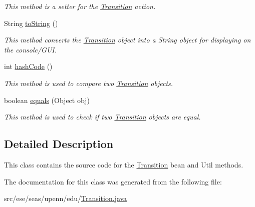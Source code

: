 \begin{DoxyCompactItemize}
\begin{DoxyCompactList}\small\item\em This method is a setter for the \hyperlink{classese_1_1seas_1_1upenn_1_1edu_1_1_transition}{Transition} action. \end{DoxyCompactList}\item 
\hypertarget{classese_1_1seas_1_1upenn_1_1edu_1_1_transition_ae9e57256dc34d80b35316193f3d4807a}{}String \hyperlink{classese_1_1seas_1_1upenn_1_1edu_1_1_transition_ae9e57256dc34d80b35316193f3d4807a}{to\+String} ()\label{classese_1_1seas_1_1upenn_1_1edu_1_1_transition_ae9e57256dc34d80b35316193f3d4807a}

\begin{DoxyCompactList}\small\item\em This method converts the \hyperlink{classese_1_1seas_1_1upenn_1_1edu_1_1_transition}{Transition} object into a String object for displaying on the console/\+G\+U\+I. \end{DoxyCompactList}\item 
\hypertarget{classese_1_1seas_1_1upenn_1_1edu_1_1_transition_a6ef52b94cb2f06593fff3144d9db61fb}{}int \hyperlink{classese_1_1seas_1_1upenn_1_1edu_1_1_transition_a6ef52b94cb2f06593fff3144d9db61fb}{hash\+Code} ()\label{classese_1_1seas_1_1upenn_1_1edu_1_1_transition_a6ef52b94cb2f06593fff3144d9db61fb}

\begin{DoxyCompactList}\small\item\em This method is used to compare two \hyperlink{classese_1_1seas_1_1upenn_1_1edu_1_1_transition}{Transition} objects. \end{DoxyCompactList}\item 
\hypertarget{classese_1_1seas_1_1upenn_1_1edu_1_1_transition_a704a4dd99037e7a33b79d1d785210d67}{}boolean \hyperlink{classese_1_1seas_1_1upenn_1_1edu_1_1_transition_a704a4dd99037e7a33b79d1d785210d67}{equals} (Object obj)\label{classese_1_1seas_1_1upenn_1_1edu_1_1_transition_a704a4dd99037e7a33b79d1d785210d67}

\begin{DoxyCompactList}\small\item\em This method is used to check if two \hyperlink{classese_1_1seas_1_1upenn_1_1edu_1_1_transition}{Transition} objects are equal. \end{DoxyCompactList}\end{DoxyCompactItemize}


\subsection{Detailed Description}
This class contains the source code for the \hyperlink{classese_1_1seas_1_1upenn_1_1edu_1_1_transition}{Transition} bean and Util methods. 

The documentation for this class was generated from the following file\+:\begin{DoxyCompactItemize}
\item 
src/ese/seas/upenn/edu/\hyperlink{_transition_8java}{Transition.\+java}\end{DoxyCompactItemize}
